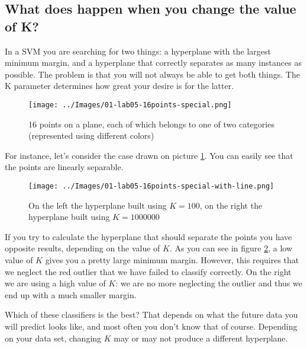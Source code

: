     \subsection{What does happen when you change the value of K?}
        In a SVM you are searching for two things: a hyperplane with the largest minimum margin, and a hyperplane that correctly separates as many instances as possible. The problem is that you will not always be able to get both things. The K parameter determines how great your desire is for the latter.\par
        \begin{figure}
            \centering
            \texttt{[image: ../Images/01-lab05-16points-special.png]}
            \caption{16 points on a plane, each of which belongs to one of two categories (represented using different colors)}
            \label{01-lab05-16points-special}
        \end{figure}
        For instance, let's consider the case drawn on picture \ref{01-lab05-16points-special}. You can easily see that the points are linearly separable.
        \begin{figure}
            \centering
            \texttt{[image: ../Images/01-lab05-16points-special-with-line.png]}
            \caption{On the left the hyperplane built using \(K=100\), on the right the hyperplane built using \(K=1000000\)}
            \label{01-lab05-16points-special-with-line}
        \end{figure}
        If you try to calculate the hyperplane that should separate the points you have opposite results, depending on the value of \(K\). As you can see in figure \ref{01-lab05-16points-special-with-line}, a low value of \(K\) gives you a pretty large minimum margin. However, this requires that we neglect the red outlier that we have failed to classify correctly. On the right we are using a high value of \(K\): we are no more neglecting the outlier and thus we end up with a much smaller margin.\par
        Which of these classifiers is the best? That depends on what the future data you will predict looks like, and most often you don't know that of course. Depending on your data set, changing \(K\) may or may not produce a different hyperplane.